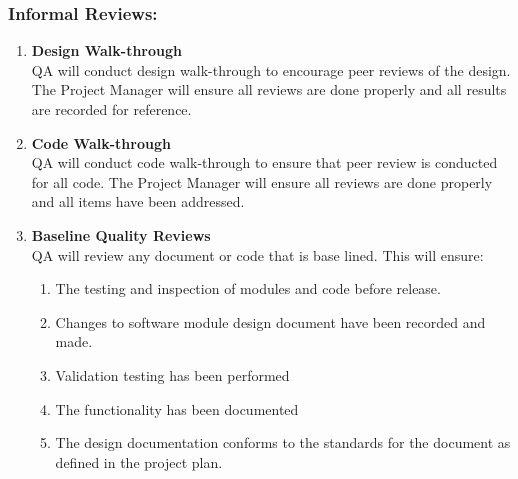\documentclass[a3paper, 11pt]{article}
\begin{document}
\subsubsection{Informal Reviews:}
\begin{enumerate}[label=\Alph*.]
	\setlength\itemsep{-0.25em}
	\item \textbf{Design Walk-through\\} QA will conduct design walk-through to encourage peer reviews of the design. The Project Manager will ensure all reviews are done properly and all results are recorded for reference. 
	\item \textbf{Code Walk-through\\} QA will conduct code walk-through to ensure that peer review is conducted for all code. The Project Manager will ensure all reviews are done properly and all items have been addressed.
	\item \textbf{Baseline Quality Reviews\\} QA will review any document or code that is base lined. This will ensure:
	\begin{enumerate}
		\item The testing and inspection of modules and code before release.
		\item Changes to software module design document have been recorded and made.
		\item Validation testing has been performed
		\item The functionality has been documented
		\item The design documentation conforms to the standards for the document as defined in the project plan. 
	\end{enumerate}
\end{enumerate}
\end{document}
